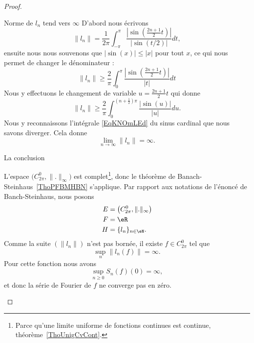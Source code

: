 \begin{proof}
\begin{subproof}
		\item[Norme de \( l_n\) tend vers \( \infty\)]
		D'abord nous écrivons
		\begin{equation}
			\| l_n \|=\frac{1}{ 2\pi }\int_{-\pi}^{\pi}\frac{ \left| \sin\left( \frac{ 2n+1 }{2}t \right) \right|  }{ \big| \sin(t/2) \big| }dt,
		\end{equation}
		ensuite nous nous souvenons que \( | \sin(x) |\leq | x |\) pour tout \( x\), ce qui nous permet de changer le dénominateur :
		\begin{equation}
			\| l_n \|\geq \frac{ 2 }{ \pi }\int_0^{\pi}\frac{ \left| \sin\left( \frac{ 2n+1 }{2}t \right) \right|  }{ | t | }dt
		\end{equation}
		Nous y effectuons le changement de variable \( u=\frac{ 2n+1 }{2}t\) qui donne
		\begin{equation}
			\| l_n \|\geq \frac{ 2 }{ \pi }\int_{0}^{(n+\frac{ 1 }{2})\pi}\frac{ \big| \sin(u) \big| }{ | u | }du.
		\end{equation}
		Nous y reconnaissons l'intégrale \eqref{EqKNOmLEd} du sinus cardinal que nous savons diverger. Cela donne
		\begin{equation}
			\lim_{n\to \infty} \| l_n \|=\infty.
		\end{equation}
		\item[La conclusion]

		L'espace \( \big( C^0_{2\pi},\| . \|_{\infty} \big)\) est complet\footnote{Parce qu'une limite uniforme de fonctions continues est continue, théorème~\ref{ThoUnigCvCont}.}, donc le théorème de Banach-Steinhaus~\ref{ThoPFBMHBN} s'applique. Par rapport aux notations de l'énoncé de Banch-Steinhaus, nous posons
		\begin{subequations}
			\begin{align}
				E & =\big( C^0_{2\pi},\| . \|_{\infty} \big) \\
				F & =\eR                                     \\
				H & =\{ l_n \}_{n\in \eN}.
			\end{align}
		\end{subequations}
		Comme la suite \( (\| l_n \|)\) n'est pas bornée, il existe \( f\in C^0_{2\pi}\) tel que
		\begin{equation}
			\sup_n\| l_n(f) \|=\infty.
		\end{equation}
		Pour cette fonction nous avons
		\begin{equation}
			\sup_{n\geq 0}S_n(f)(0)=\infty,
		\end{equation}
		et donc la série de Fourier de \( f\) ne converge pas en zéro.

	\end{subproof}
\end{proof}

